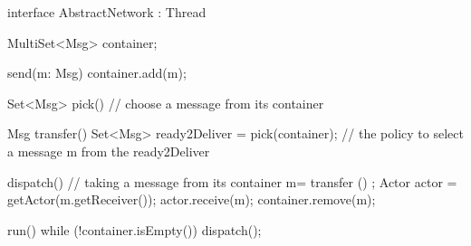 interface AbstractNetwork : Thread {
    MultiSet<Msg> container;
   
    send(m: Msg) {
        container.add(m);
    }
   
   Set<Msg> pick() {
        // choose a message from its container
    }
    
    Msg transfer() {
        Set<Msg> ready2Deliver = pick(container);
        // the policy to select a message m from the ready2Deliver
    }
    
    dispatch()
    {
      // taking a message from its container
        m= transfer () ;
        Actor actor = getActor(m.getReceiver());
        actor.receive(m);
        container.remove(m);    
    }

     run() {
        while (!container.isEmpty()) {
            dispatch();
        }
    }   
    
}